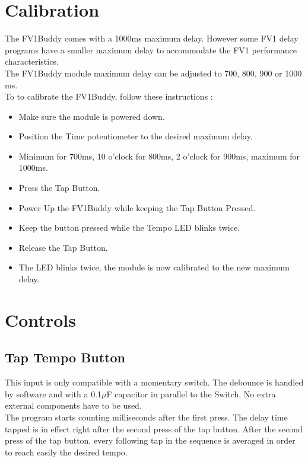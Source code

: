 \documentclass[a4paper, 10pt]{article}
\begin{document}
\section{Calibration}
\label{sec:calib}
\bigbreak
The FV1Buddy comes with a 1000ms maximum delay. However some FV1 delay programs have a smaller maximum delay to accommodate the FV1 performance characteristics.\\
The FV1Buddy module maximum delay can be adjusted to 700, 800, 900 or 1000 ms.\\

To to calibrate the FV1Buddy, follow these instructions :\\
\begin{itemize}
\item Make sure the module is powered down.
\item Position the Time potentiometer to the desired maximum delay.
\item Minimum for 700ms, 10 o'clock for 800ms, 2 o'clock for 900ms, maximum for 1000ms.
\item Press the Tap Button.
\item Power Up the FV1Buddy while keeping the Tap Button Pressed.
\item Keep the button pressed while the Tempo LED blinks twice.
\item Release the Tap Button.
\item The LED blinks twice, the module is now calibrated to the new maximum delay.\\
\end{itemize}

\newpage
\section{Controls}
\subsection{Tap Tempo Button}
\bigbreak
This input is only compatible with a momentary switch.
The debounce is handled by software and with a 0.1$\mu$F capacitor in parallel to the Switch. No extra external components have to be used.\\

The program starts counting milliseconds after the first press. The delay time tapped is in effect right after the second press of the tap button. After the second press of the tap button, every following tap in the sequence is averaged in order to reach easily the desired tempo. 
\end{document}
